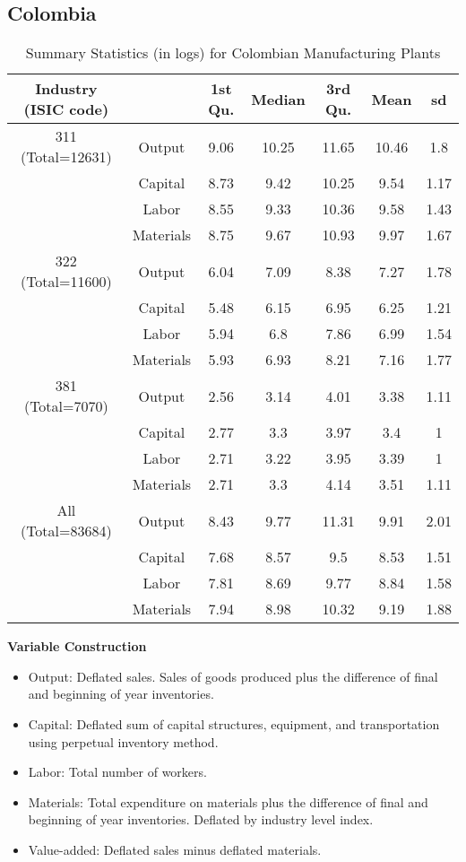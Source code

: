 \documentclass[12pt]{article}
\begin{document}
\begin{appendices}
\subsection{Colombia} \label{COLdata}

\begin{table}[H]
\centering
\caption{Summary Statistics (in logs) for Colombian Manufacturing Plants}
\small
\begin{tabular}{ccccccc}
  \hline\hline Industry (ISIC code) &   & 1st Qu. & Median & 3rd Qu. & Mean & sd \\ 
  \hline
311 (Total=12631) & Output & 9.06 & 10.25 & 11.65 & 10.46 & 1.8 \\ 
   & Capital & 8.73 & 9.42 & 10.25 & 9.54 & 1.17 \\ 
   & Labor & 8.55 & 9.33 & 10.36 & 9.58 & 1.43 \\ 
   & Materials & 8.75 & 9.67 & 10.93 & 9.97 & 1.67 \\ 
  322 (Total=11600) & Output & 6.04 & 7.09 & 8.38 & 7.27 & 1.78 \\ 
   & Capital & 5.48 & 6.15 & 6.95 & 6.25 & 1.21 \\ 
   & Labor & 5.94 & 6.8 & 7.86 & 6.99 & 1.54 \\ 
   & Materials & 5.93 & 6.93 & 8.21 & 7.16 & 1.77 \\ 
  381 (Total=7070) & Output & 2.56 & 3.14 & 4.01 & 3.38 & 1.11 \\ 
   & Capital & 2.77 & 3.3 & 3.97 & 3.4 & 1 \\ 
   & Labor & 2.71 & 3.22 & 3.95 & 3.39 & 1 \\ 
   & Materials & 2.71 & 3.3 & 4.14 & 3.51 & 1.11 \\ 
  All (Total=83684) & Output & 8.43 & 9.77 & 11.31 & 9.91 & 2.01 \\ 
   & Capital & 7.68 & 8.57 & 9.5 & 8.53 & 1.51 \\ 
   & Labor & 7.81 & 8.69 & 9.77 & 8.84 & 1.58 \\ 
   & Materials & 7.94 & 8.98 & 10.32 & 9.19 & 1.88 \\ 
   \hline
\end{tabular}
\label{COLsum}
\end{table}

\textbf{Variable Construction}
\begin{itemize}
	\item Output: Deflated sales. Sales of goods produced plus the difference of final and beginning of year inventories.
	\item Capital: Deflated sum of capital structures, equipment, and transportation using perpetual inventory method.
	\item Labor: Total number of workers.
	\item Materials: Total expenditure on materials plus the difference of final and beginning of year inventories. Deflated by industry level index.
	\item Value-added: Deflated sales minus deflated materials.
\end{itemize}


\end{appendices}
\end{document}
